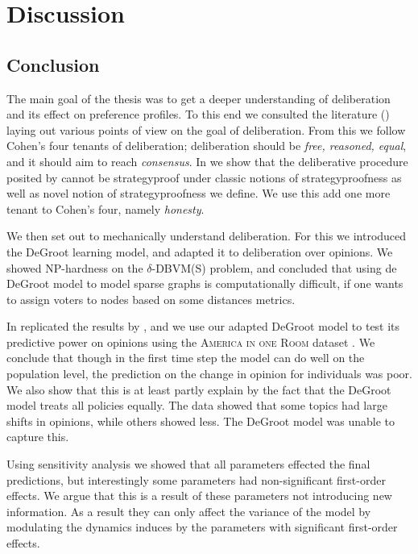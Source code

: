 \newpage
\chapter{Discussion}
\label{Discussion}

\section{Conclusion}

The main goal of the thesis was to get a deeper understanding of deliberation
and its effect on preference profiles. To this end we consulted the literature
() laying out various points of view on the goal of
deliberation. From this we follow Cohen's
\cite{cohenDeliberationDemocraticLegimitimacy2002} four tenants of
deliberation; deliberation should be \textit{free, reasoned, equal}, and  it
should aim to reach \textit{consensus}. In  we show that the
deliberative procedure posited by
\citet{radDeliberationSinglePeakednessCoherent2021} cannot be strategyproof
under classic notions of strategyproofness as well as novel notion of
strategyproofness we define. We use this add one more tenant to Cohen's four,
namely \textit{honesty}.

We then set out to mechanically understand deliberation. For this we introduced
the DeGroot learning model, and adapted it to deliberation over opinions. We showed
NP-hardness on the $\delta$-DBVM(S) problem, and concluded that using de DeGroot model
to model sparse graphs is computationally difficult, if one wants to assign voters to nodes
based on some distances metrics.

In  replicated the results by
\citet{radDeliberationSinglePeakednessCoherent2021}, and we use our adapted
DeGroot model to test its predictive power on opinions using the
\textsc{America in one Room} dataset \cite{fishkinCanDeliberationHave2024}. We
conclude that though in the first time step the model can do well on the
population level, the prediction on the change in opinion for individuals was
poor. We also show that this is at least partly explain by the fact that the
DeGroot model treats all policies equally. The data showed that some topics had
large shifts in opinions, while others showed less. The DeGroot model was
unable to capture this.

Using sensitivity analysis we showed that all parameters effected the final
predictions, but interestingly some parameters had non-significant first-order
effects. We argue that this is a result of these parameters not introducing new
information. As a result they can only affect the variance of the model by
modulating the dynamics induces by the parameters with significant first-order
effects.

